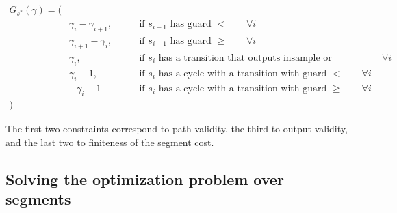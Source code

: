 \documentclass{article}
\newcommand{\1}{\langle 1 \rangle}
\newcommand{\2}{\langle 2 \rangle}
\begin{document}
\begin{align*}
    G_{s^*}(\gamma) = 
        ( &\\
        &\gamma_{i} - \gamma_{i + 1},  \qquad &\text{if } s_{i + 1} \text{ has guard } < \qquad \forall i \\
        &\gamma_{i + 1} - \gamma_{i}, \qquad &\text{if } s_{i + 1} \text{ has guard } \geq \qquad \forall i \\[1em]
        &\gamma_i, \qquad &\text{if } s_i \text{ has a transition that outputs insample or insample'}     \qquad \forall i \\[1em]
        &\gamma_i - 1, \qquad &\text{if } s_i \text{ has a cycle with a transition with guard } < \qquad \forall i \\
        &-\gamma_i - 1 \qquad &\text{if } s_i \text{ has a cycle with a transition with guard } \geq \qquad \forall i \\
        ) &
\end{align*}

The first two constraints correspond to path validity, the third to output validity, and the last two to finiteness of the segment cost.

\subsection{Solving the optimization problem over segments}
\end{document}

